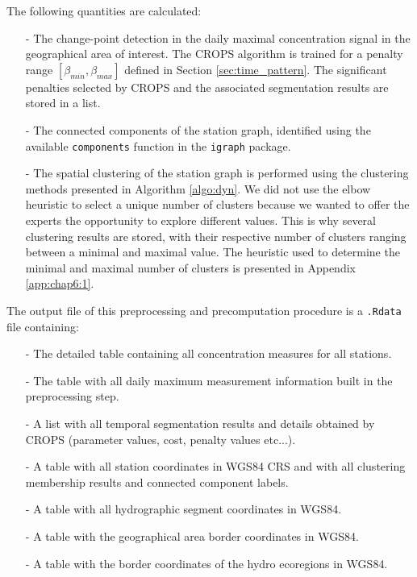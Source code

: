 The following quantities are calculated:
\begin{itemize}
\item[-] The change-point detection in the daily maximal concentration signal in the geographical area of interest. The CROPS algorithm is trained for a penalty range $[\beta_{min},\beta_{max}]$ defined in Section \ref{sec:time_pattern}. The significant penalties selected by CROPS and the associated segmentation results are stored in a list.
\item[-] The connected components of the station graph, identified using the available \texttt{components} function in the \texttt{igraph} package.
\item[-] The spatial clustering of the station graph is performed using the clustering methods presented in Algorithm \ref{algo:dyn}. We did not use the elbow heuristic to select a unique number of clusters because we wanted to offer the experts the opportunity to explore different values. This is why several clustering results are stored, with their respective number of clusters ranging between a minimal and maximal value. The heuristic used to determine the minimal and maximal number of clusters is presented in Appendix \ref{app:chap6:1}.  
\end{itemize}

The output file of this preprocessing and precomputation procedure is a \texttt{.Rdata} file containing: 
\begin{itemize}
\item[-] The detailed table containing all concentration measures for all stations.
\item[-] The table with all daily maximum measurement information built in the preprocessing step.
\item[-] A list with all temporal segmentation results and details obtained by CROPS (parameter values, cost, penalty values etc...).
\item[-] A table with all station coordinates in WGS84 CRS and with all clustering membership results and connected component labels. 
\item[-] A table with all hydrographic segment coordinates in WGS84. 
\item[-] A table with the geographical area border coordinates in WGS84.
\item[-] A table with the border coordinates of the hydro ecoregions in WGS84.
\end{itemize}

